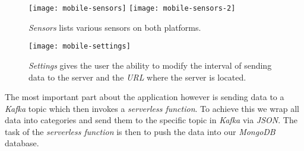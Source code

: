 \begin{figure}[H]
  \centering
  \texttt{[image: mobile-sensors]}
  \texttt{[image: mobile-sensors-2]}
  \caption{\textit{Sensors} lists various sensors on both platforms.}
\end{figure}

\begin{figure}[H]
  \centering
  \texttt{[image: mobile-settings]}
  \caption{\textit{Settings} gives the user the ability to modify the interval of sending data to the
  server and the \textit{URL} where the server is located.}
\end{figure}

The most important part about the application however is sending data to a \textit{Kafka} topic
which then invokes a \textit{serverless function}. To achieve this we wrap all data into categories
and send them to the specific topic in \textit{Kafka} via \textit{JSON}. The task of the
\textit{serverless function} is then to push the data into our \textit{MongoDB} database.
